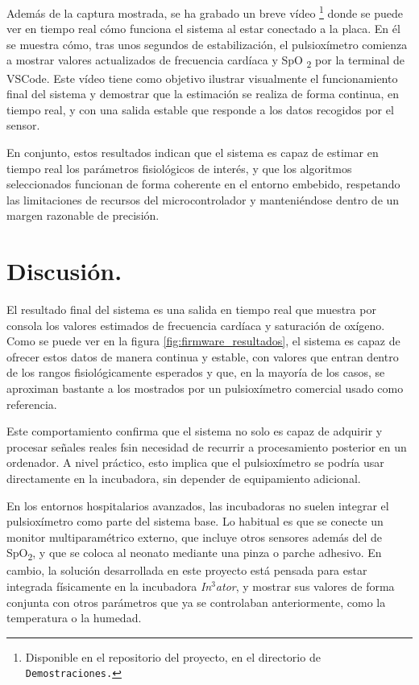 Además de la captura mostrada, se ha grabado un breve vídeo \footnote{Disponible en el repositorio del proyecto, en el directorio de \texttt{Demostraciones.}} donde se puede ver en tiempo real cómo funciona el sistema al estar conectado a la placa. En él se muestra cómo, tras unos segundos de estabilización, el pulsioxímetro comienza a mostrar valores actualizados de frecuencia cardíaca y SpO \textsubscript{2} por la terminal de VSCode. Este vídeo tiene como objetivo ilustrar visualmente el funcionamiento final del sistema y demostrar que la estimación se realiza de forma continua, en tiempo real, y con una salida estable que responde a los datos recogidos por el sensor.

En conjunto, estos resultados indican que el sistema es capaz de estimar en tiempo real los parámetros fisiológicos de interés, y que los algoritmos seleccionados funcionan de forma coherente en el entorno embebido, respetando las limitaciones de recursos del microcontrolador y manteniéndose dentro de un margen razonable de precisión.


\section{Discusión.}

El resultado final del sistema es una salida en tiempo real que muestra por consola los valores estimados de frecuencia cardíaca y saturación de oxígeno. Como se puede ver en la figura \ref{fig:firmware_resultados}, el sistema es capaz de ofrecer estos datos de manera continua y estable, con valores que entran dentro de los rangos fisiológicamente esperados y que, en la mayoría de los casos, se aproximan bastante a los mostrados por un pulsioxímetro comercial usado como referencia.

Este comportamiento confirma que el sistema no solo es capaz de adquirir y procesar señales reales fsin necesidad de recurrir a procesamiento posterior en un ordenador. A nivel práctico, esto implica que el pulsioxímetro se podría usar directamente en la incubadora, sin depender de equipamiento adicional.

En los entornos hospitalarios avanzados, las incubadoras no suelen integrar el pulsioxímetro como parte del sistema base. Lo habitual es que se conecte un monitor multiparamétrico externo, que incluye otros sensores además del de SpO\textsubscript{2}, y que se coloca al neonato mediante una pinza o parche adhesivo. En cambio, la solución desarrollada en este proyecto está pensada para estar integrada físicamente en la incubadora \textit{In$^3$ator}, y mostrar sus valores de forma conjunta con otros parámetros que ya se controlaban anteriormente, como la temperatura o la humedad. 

